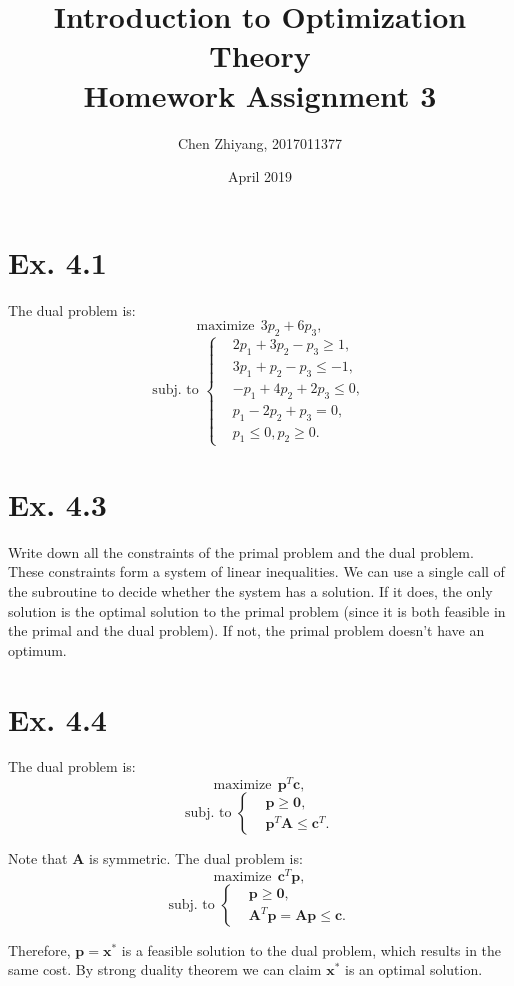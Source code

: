 \documentclass[12pt]{article}
\title{Introduction to Optimization Theory\\Homework Assignment 3}
\author{Chen Zhiyang, 2017011377}
\date{April 2019}
\begin{document}
\maketitle

\section*{Ex. 4.1}
The dual problem is:
$$\text{maximize}\ \ 3p_2+6p_3,$$
$$\text{subj.\ to\ }\left\{\begin{aligned}
    &2p_1+3p_2-p_3\ge 1,\\
    &3p_1+p_2-p_3\le -1,\\
    &-p_1+4p_2+2p_3\le 0,\\
    &p_1-2p_2+p_3=0,\\
    &p_1\le 0,p_2\ge 0.
\end{aligned}\right.$$

\section*{Ex. 4.3}
Write down all the constraints of the primal problem and the dual problem. These constraints form a system of linear inequalities. We can use a single call of the subroutine to decide whether the system has a solution. If it does, the only solution is the optimal solution to the primal problem (since it is both feasible in the primal and the dual problem). If not, the primal problem doesn't have an optimum.

\section*{Ex. 4.4}
The dual problem is:
$$\text{maximize}\ \ \bm{p}^T\bm{c},$$
$$\text{subj.\ to\ }\left\{\begin{aligned}
    &\bm{p}\ge\bm{0},\\
    &\bm{p}^T\bm{A}\le\bm{c}^T.
\end{aligned}\right.$$

Note that $\bm{A}$ is symmetric. The dual problem is:
$$\text{maximize}\ \ \bm{c}^T\bm{p},$$
$$\text{subj.\ to\ }\left\{\begin{aligned}
    &\bm{p}\ge\bm{0},\\
    &\bm{A}^T\bm{p}=\bm{A}\bm{p}\le\bm{c}.
\end{aligned}\right.$$

Therefore, $\bm{p}=\bm{x}^*$ is a feasible solution to the dual problem, which results in the same cost. By strong duality theorem we can claim $\bm{x}^*$ is an optimal solution.
\end{document}
